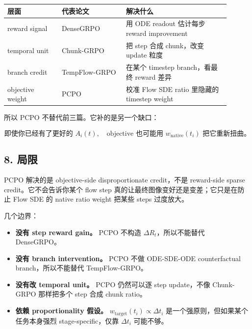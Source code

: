 \begin{center}
\begin{tabular}{p{0.22\linewidth}p{0.26\linewidth}p{0.42\linewidth}}
\toprule
\textbf{层面} & \textbf{代表论文} & \textbf{解决什么} \\
\midrule
reward signal & DenseGRPO & 用 ODE readout 估计每步 reward improvement \\
temporal unit & Chunk-GRPO & 把 step 合成 chunk，改变 update 粒度 \\
branch credit & TempFlow-GRPO & 在某个 timestep branch，看最终 reward 差异 \\
objective weight & PCPO & 校准 Flow SDE ratio 里隐藏的 timestep weight \\
\bottomrule
\end{tabular}
\end{center}

所以 PCPO 不替代前三篇。它补的是另一个缺口：

\[
\text{即使你已经有了更好的 } A_i(t),
\quad
\text{objective 也可能用 } w_{\mathrm{native}}(t_i)
\text{ 把它重新扭曲。}
\]

\subsection{8. 局限}

\begin{warnbox}
PCPO 解决的是 objective-side disproportionate credit，不是 reward-side sparse credit。它不会告诉你某个 flow step 真的让最终图像变好还是变差；它只是在防止 Flow SDE 的 native ratio weight 把某些 steps 过度放大。
\end{warnbox}

几个边界：

\begin{itemize}[leftmargin=2em]
  \item \textbf{没有 step reward gain。} PCPO 不构造 \(\Delta R_t\)，所以不能替代 DenseGRPO。
  \item \textbf{没有 branch intervention。} PCPO 不做 ODE-SDE-ODE counterfactual branch，所以不能替代 TempFlow-GRPO。
  \item \textbf{没有改 temporal unit。} PCPO 仍然可以逐 step update，不像 Chunk-GRPO 那样把多个 step 合成 chunk ratio。
  \item \textbf{依赖 proportionality 假设。} \(w_{\mathrm{target}}(t_i)\propto \Delta t_i\) 是一个强原则，但如果某个任务本身强烈 stage-specific，仅靠 \(\Delta t_i\) 可能不够。
\end{itemize}

